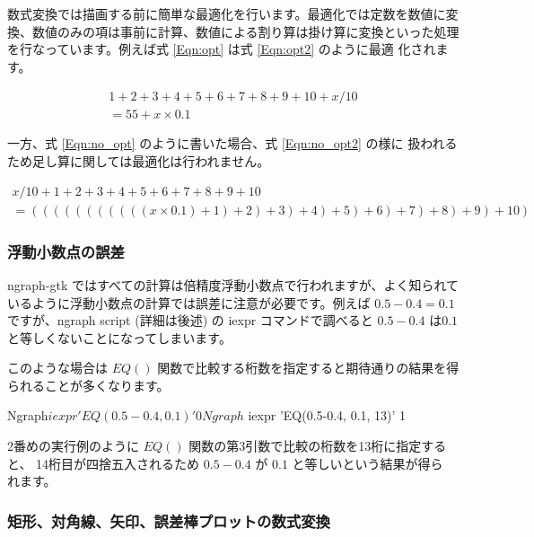 \documentclass[mingoth,a4paper,twoside]{jsarticle}
\begin{document}
数式変換では描画する前に簡単な最適化を行います。最適化では定数を数値に変
換、数値のみの項は事前に計算、数値による割り算は掛け算に変換といった処理
を行なっています。例えば式 \ref{Eqn:opt} は式 \ref{Eqn:opt2} のように最適
化されます。

\begin{eqnarray}
 1 + 2 + 3 + 4 + 5 + 6 + 7 + 8 + 9 + 10 + x / 10 \label{Eqn:opt}\\
 = 55 + x \times 0.1 \label{Eqn:opt2}
\end{eqnarray}

一方、式 \ref{Eqn:no_opt} のように書いた場合、式 \ref{Eqn:no_opt2} の様に
扱われるため足し算に関しては最適化は行われません。

\begin{eqnarray}
 x / 10 + 1 + 2 + 3 + 4 + 5 + 6 + 7 + 8 + 9 + 10  \label{Eqn:no_opt} \\
 = (((((((((((x \times 0.1) + 1) + 2) + 3) + 4) + 5) + 6) + 7) + 8) + 9) + 10)  \label{Eqn:no_opt2}
\end{eqnarray}

\subsubsection{浮動小数点の誤差}

ngraph-gtk ではすべての計算は倍精度浮動小数点で行われますが、よく知られて
いるように浮動小数点の計算では誤差に注意が必要です。例えば $0.5 - 0.4 =
0.1$ですが、ngraph script (詳細は後述) の iexpr コマンドで調べると $0.5
- 0.4$ は$0.1$ と等しくないことになってしまいます。

\noindent
このような場合は $EQ()$ 関数で比較する桁数を指定すると期待通りの結果を得
られることが多くなります。

\begin{commandline}
Ngraph$ iexpr 'EQ(0.5-0.4, 0.1)'
0
Ngraph$ iexpr 'EQ(0.5-0.4, 0.1, 13)'
1
\end{commandline}

\noindent
2番めの実行例のように $EQ()$ 関数の第3引数で比較の桁数を13桁に指定すると、
14桁目が四捨五入されるため $0.5 - 0.4$ が $0.1$ と等しいという結果が得ら
れます。

\subsubsection{矩形、対角線、矢印、誤差棒プロットの数式変換}
\end{document}
